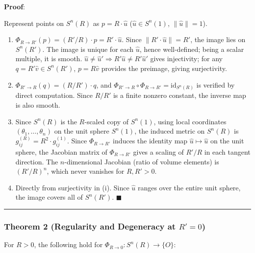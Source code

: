 \documentclass[
  a4paper]{article}
\begin{document}
\textbf{Proof}:

Represent points on \(S^n(R)\) as \(p = R \cdot \hat{u}\)
(\(\hat{u} \in S^n(1)\), \(\|\hat{u}\| = 1\)).

\begin{enumerate}
\def\labelenumi{(\roman{enumi})}
\item
  \(\Phi_{R \to R'}(p) = (R'/R) \cdot p = R' \cdot \hat{u}\). Since
  \(\|R' \cdot \hat{u}\| = R'\), the image lies on \(S^n(R')\). The
  image is unique for each \(\hat{u}\), hence well-defined; being a
  scalar multiple, it is smooth.
  \(\hat{u} \neq \hat{u}' \Rightarrow R' \hat{u} \neq R' \hat{u}'\)
  gives injectivity; for any \(q = R' \hat{v} \in S^n(R')\),
  \(p = R \hat{v}\) provides the preimage, giving surjectivity.
\item
  \(\Phi_{R' \to R}(q) = (R/R') \cdot q\), and
  \(\Phi_{R' \to R} \circ \Phi_{R \to R'} = \mathrm{id}_{S^n(R)}\) is
  verified by direct computation. Since \(R/R'\) is a finite nonzero
  constant, the inverse map is also smooth.
\item
  Since \(S^n(R)\) is the \(R\)-scaled copy of \(S^n(1)\), using local
  coordinates \((\theta_1, \ldots, \theta_n)\) on the unit sphere
  \(S^n(1)\), the induced metric on \(S^n(R)\) is
  \(g_{ij}^{(R)} = R^2 \cdot g_{ij}^{(1)}\). Since \(\Phi_{R \to R'}\)
  induces the identity map \(\hat{u} \mapsto \hat{u}\) on the unit
  sphere, the Jacobian matrix of \(\Phi_{R \to R'}\) gives a scaling of
  \(R'/R\) in each tangent direction. The \(n\)-dimensional Jacobian
  (ratio of volume elements) is \((R'/R)^n\), which never vanishes for
  \(R, R' > 0\).
\item
  Directly from surjectivity in (i). Since \(\hat{u}\) ranges over the
  entire unit sphere, the image covers all of \(S^n(R')\).
  \(\blacksquare\)
\end{enumerate}

\begin{center}\rule{0.5\linewidth}{0.5pt}\end{center}

\subsubsection{\texorpdfstring{Theorem 2 (Regularity and Degeneracy at
\(R' = 0\))}{Theorem 2 (Regularity and Degeneracy at R\textquotesingle{} = 0)}}\label{theorem-2-regularity-and-degeneracy-at-r-0}

For \(R > 0\), the following hold for
\(\Phi_{R \to 0} : S^n(R) \to \{O\}\):
\end{document}
